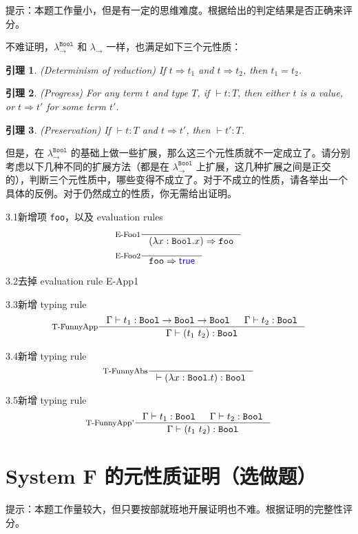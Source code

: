 \documentclass[11pt, a4paper]{article}
\newcommand{\kai}{\CJKfamily{kai}}
\newtheorem{lemma}{引理}
\let\t\texttt
\let\to\rightarrow
\let\reduce\Rightarrow
\newcommand{\Bool}{\t{Bool}}
\newcommand{\kword}[1]{{\color{blue} \textsf{#1}}}
\newcommand{\True}{\kword{true}}
\begin{document}
{\kai 提示：本题工作量小，但是有一定的思维难度。根据给出的判定结果是否正确来评分。}

不难证明，$\lambda_\to^{\Bool}$ 和 $\lambda_\to$ 一样，也满足如下三个元性质：

\begin{lemma}
    (Determinism of reduction) If $t \reduce t_1$ and $t \reduce t_2$, then $t_1 = t_2$.
\end{lemma}

\begin{lemma}
    (Progress) For any term $t$ and type $T$, if $\vdash t : T$,
    then either $t$ is a value, or $t \reduce t'$ for some term $t'$.
\end{lemma}

\begin{lemma}
    (Preservation) If $\vdash t:T$ and $t \reduce t'$, then $\vdash t':T$.
\end{lemma}

但是，在 $\lambda_\to^{\Bool}$ 的基础上做一些扩展，那么这三个元性质就不一定成立了。请分别考虑以下几种不同的扩展方法（都是在 $\lambda_\to^{\Bool}$ 上扩展，这几种扩展之间是正交的），判断三个元性质中，哪些变得不成立了。对于不成立的性质，请各举出一个具体的反例。对于仍然成立的性质，你无需给出证明。

3.1\quad 新增项 \t{foo}，以及 evaluation rules
\begin{align*}
    & \inference[E-Foo1]{}{(\lambda x:\Bool.x) \reduce \t{foo}} \\
    & \inference[E-Foo2]{}{\t{foo} \reduce \True}
\end{align*}

3.2\quad 去掉 evaluation rule E-App1

3.3\quad 新增 typing rule
$$
    \inference[T-FunnyApp]{\Gamma\vdash t_1:\Bool\to\Bool\to\Bool & \Gamma\vdash t_2:\Bool}
        {\Gamma\vdash (t_1~t_2):\Bool}
$$

3.4\quad 新增 typing rule
$$
    \inference[T-FunnyAbs]{}{\vdash (\lambda x:\Bool.t) : \Bool}
$$

3.5\quad 新增 typing rule
$$
    \inference[T-FunnyApp']{\Gamma\vdash t_1:\Bool & \Gamma\vdash t_2:\Bool}{\Gamma\vdash (t_1~t_2):\Bool}
$$

\section{System F 的元性质证明（选做题）}

{\kai 提示：本题工作量较大，但只要按部就班地开展证明也不难。根据证明的完整性评分。}
\end{document}
